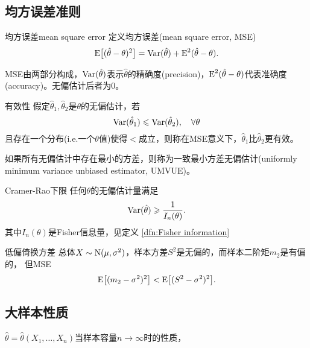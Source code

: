 \subsection{均方误差准则}
\begin{definition}{均方误差}{mean square error}
	定义均方误差(mean square error, MSE)
	\begin{align}
		\operatorname{E}\bigl[(\hat\theta-\theta)^2\bigr]=\operatorname{Var}(\hat\theta)+\operatorname{E}^2(\hat\theta-\theta).
	\end{align}
\end{definition}
MSE由两部分构成，$\operatorname{Var}(\hat\theta)$表示$\hat\theta$的精确度(precision)，$\operatorname{E}^2(\hat\theta-\theta)$代表准确度(accuracy)。无偏估计后者为0。
\begin{definition}{有效性}{}
	假定$\hat\theta_1,\hat\theta_2$是$\theta$的无偏估计，若
	\[
		\operatorname{Var}(\hat\theta_1)\leqslant\operatorname{Var}(\hat\theta_2),\quad\forall\theta
	\]
	且存在一个分布(i.e.一个$\theta$值)使得$<$成立，则称在MSE意义下，$\hat\theta_1$比$\hat\theta_2$更有效。
\end{definition}
如果所有无偏估计中存在最小的方差，则称为一致最小方差无偏估计(uniformly minimum variance unbiased estimator, UMVUE)。
\begin{theorem}{Cramer-Rao下限}{}
	任何$\theta$的无偏估计量满足
	\begin{align}
		\operatorname{Var}(\hat\theta)\geqslant\frac1{I_n(\theta)}.
	\end{align}
	其中$I_n(\theta)$是Fisher信息量，见定义 \ref{dfn:Fisher information}
\end{theorem}
\begin{example}{低偏倚换方差}{}
	总体$X\sim\operatorname{N}(\mu,\sigma^2)$，样本方差$S^2$是无偏的，而样本二阶矩$m_2$是有偏的，
	但MSE
	\[
		\operatorname{E}\bigl[(m_2-\sigma^2)^2\bigr]<\operatorname{E}\bigl[(S^2-\sigma^2)^2\bigr].
	\]
\end{example}
\subsection{大样本性质}
$\hat\theta=\hat\theta(X_1,\ldots,X_n)$当样本容量$n\to\infty$时的性质，

